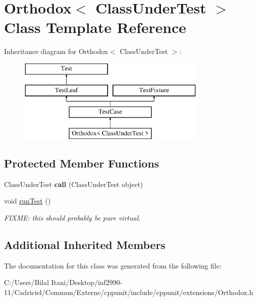 \hypertarget{class_orthodox}{}\section{Orthodox$<$ Class\+Under\+Test $>$ Class Template Reference}
\label{class_orthodox}
Inheritance diagram for Orthodox$<$ Class\+Under\+Test $>$\+:\begin{figure}[H]
\begin{center}
\leavevmode
\includegraphics[height=4.000000cm]{class_orthodox}
\end{center}
\end{figure}
\subsection*{Protected Member Functions}
\begin{DoxyCompactItemize}
\item 
Class\+Under\+Test {\bfseries call} (Class\+Under\+Test object)\hypertarget{class_orthodox_a08e9feb769578cb7a8b92c7c2c5d1874}{}\label{class_orthodox_a08e9feb769578cb7a8b92c7c2c5d1874}

\item 
void \hyperlink{class_orthodox_aaeaafea272fdce3b5b2f33882cb33d8c}{run\+Test} ()\hypertarget{class_orthodox_aaeaafea272fdce3b5b2f33882cb33d8c}{}\label{class_orthodox_aaeaafea272fdce3b5b2f33882cb33d8c}

\begin{DoxyCompactList}\small\item\em F\+I\+X\+ME\+: this should probably be pure virtual. \end{DoxyCompactList}\end{DoxyCompactItemize}
\subsection*{Additional Inherited Members}


The documentation for this class was generated from the following file\+:\begin{DoxyCompactItemize}
\item 
C\+:/\+Users/\+Bilal Itani/\+Desktop/inf2990-\/11/\+Cadriciel/\+Commun/\+Externe/cppunit/include/cppunit/extensions/Orthodox.\+h\end{DoxyCompactItemize}
